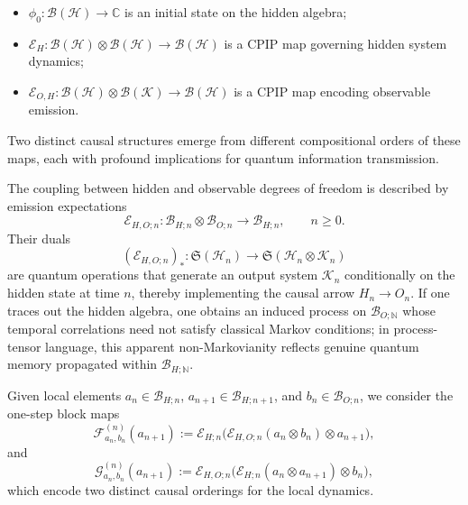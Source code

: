 \documentclass[11pt,a4paper]{article}
\begin{document}
\begin{itemize}
    \item $\phi_0: \mathcal{B}(\mathcal{H})\to \mathbb{C}$ is an initial state on the hidden algebra;
    \item $\mathcal{E}_{H}: \mathcal{B}(\mathcal{H}) \otimes \mathcal{B}(\mathcal{H}) \to \mathcal{B}(\mathcal{H})$ is a CPIP map governing hidden system dynamics;
    \item $\mathcal{E}_{O,H}: \mathcal{B}(\mathcal{H}) \otimes \mathcal{B}(\mathcal{K})\to \mathcal{B}(\mathcal{H})$ is a CPIP map encoding observable emission.
\end{itemize}

Two distinct causal structures emerge from different compositional orders of these maps, each with profound implications for quantum information transmission.



The coupling between hidden and observable degrees of freedom is described by
emission expectations
\[
\mathcal{E}_{H,O;n}:\mathcal{B}_{H;n}\otimes\mathcal{B}_{O;n}\to\mathcal{B}_{H;n},
\qquad n\ge 0.
\]
Their duals
\[
(\mathcal{E}_{H,O;n})_{*}:\mathfrak{S}(\mathcal{H}_{n})\to\mathfrak{S}(\mathcal{H}_{n}\otimes\mathcal{K}_{n})
\]
are quantum operations that generate an output system $\mathcal{K}_{n}$ conditionally
on the hidden state at time $n$, thereby implementing the causal arrow
$H_{n}\to O_{n}$.
If one traces out the hidden algebra, one obtains an induced process on
$\mathcal{B}_{O;\mathbb{N}}$ whose temporal correlations need not satisfy classical
Markov conditions; in process-tensor language, this apparent non-Markovianity
reflects genuine quantum memory propagated within $\mathcal{B}_{H;\mathbb{N}}$.

Given local elements $a_{n}\in\mathcal{B}_{H;n}$, $a_{n+1}\in\mathcal{B}_{H;n+1}$, and
$b_{n}\in\mathcal{B}_{O;n}$, we consider the one-step block maps
\begin{equation}\label{eq_F}
\mathcal{F}_{a_{n},b_{n}}^{(n)}(a_{n+1})
:=
\mathcal{E}_{H;n}\bigl(\mathcal{E}_{H,O;n}(a_{n}\otimes b_{n})\otimes a_{n+1}\bigr),
\end{equation}
and
\begin{equation}\label{eq_G}
\mathcal{G}_{a_{n},b_{n}}^{(n)}(a_{n+1})
:=
\mathcal{E}_{H,O;n}\bigl(\mathcal{E}_{H;n}(a_{n}\otimes a_{n+1})\otimes b_{n}\bigr),
\end{equation}
which encode two distinct causal orderings for the local dynamics.
\end{document}
